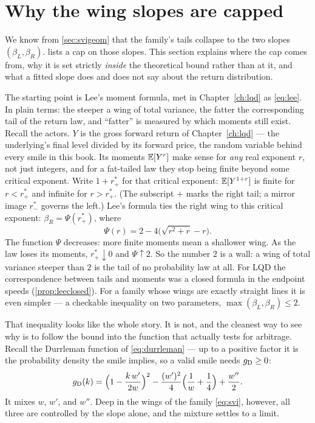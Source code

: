 \section{Why the wing slopes are capped}
\label{sec:svilee}

We know from \cref{sec:svigeom} that the family's tails collapse to the
two slopes $(\beta_L,\beta_R)$.   lists a cap on
those slopes.  This section explains where the cap comes from, why it is
set strictly \emph{inside} the theoretical bound rather than at it, and
what a fitted slope does and does not say about the return
distribution.

The starting point is Lee's moment formula, met in
Chapter~\ref{ch:lqd} as \eqref{eq:lee}.  In plain terms: the steeper a
wing of total variance, the fatter the corresponding tail of the return
law, and ``fatter'' is measured by which moments still exist.  Recall
the actors.  $Y$ is the gross forward return of Chapter~\ref{ch:lqd}
--- the underlying's final level divided by its forward price, the
random variable behind every smile in this book.  Its moments
$\mathbb{E}[Y^{r}]$ make sense for \emph{any} real exponent $r$, not just
integers, and for a fat-tailed law they stop being finite beyond some
critical exponent.  Write $1+r_+^*$ for that critical exponent:
$\mathbb{E}[Y^{1+r}]$ is finite for $r<r_+^*$ and infinite for $r>r_+^*$.
(The subscript $+$ marks the right tail; a mirror image $r_-^*$
governs the left.)  Lee's formula ties the right wing to this critical
exponent: $\beta_R=\Psi(r_+^*)$, where
\[
\Psi(r)=2-4\big(\sqrt{r^2+r}-r\big).
\]
The function $\Psi$ decreases: more finite moments mean a shallower
wing.  As the law loses its moments, $r_+^*\downarrow0$ and
$\Psi\uparrow2$.  So the number $2$ is a wall: a wing of total variance
steeper than $2$ is the tail of no probability law at all.  For LQD the
correspondence between tails and moments was a closed formula in the
endpoint speeds (\cref{prop:leeclosed}).  For a family whose wings are
exactly straight lines it is even simpler --- a checkable inequality on
two parameters, $\max(\beta_L,\beta_R)\le2$.

That inequality looks like the whole story.  It is not, and the cleanest
way to see why is to follow the bound into the function that actually
tests for arbitrage.  Recall the Durrleman function of
\eqref{eq:durrleman} --- up to a positive factor it is the probability
density the smile implies, so a valid smile needs $g_{\rm D}\ge0$:
\[
g_{\rm D}(k)=\Big(1-\frac{k\,w'}{2w}\Big)^{2}
-\frac{(w')^2}{4}\Big(\frac1w+\frac14\Big)+\frac{w''}{2}.
\]
It mixes $w$, $w'$, and $w''$.  Deep in the wings of the family
\eqref{eq:svi}, however, all three are controlled by the slope alone,
and the mixture settles to a limit.

